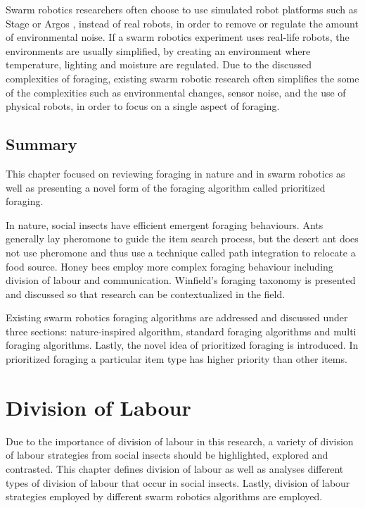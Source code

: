 Swarm robotics researchers often choose to use simulated robot platforms such as Stage \cite{vaughan2008massively} or Argos \cite{pinciroli2011argos}, instead of real robots, in order to remove or regulate the amount of environmental noise. If a swarm robotics experiment uses real-life robots, the environments are usually simplified, by creating an environment where temperature, lighting and moisture are regulated\cite{labella2006division,nouyan2006group}. Due to the discussed complexities of foraging, existing swarm robotic research often simplifies the some of the complexities such as environmental changes, sensor noise, and the use of physical robots, in order to focus on a single aspect of foraging. 

\section{Summary}
\label{foraging:summary}

This chapter focused on reviewing foraging in nature and in swarm robotics as well as presenting a novel form of the foraging algorithm called prioritized foraging. 

In nature, social insects have efficient emergent foraging behaviours. Ants generally lay pheromone to guide the item search process, but the desert ant does not use pheromone and thus use a technique called path integration to relocate a food source. Honey bees employ more complex foraging behaviour including division of labour and communication. Winfield's foraging taxonomy is presented and discussed so that research can be contextualized in the field. 

Existing swarm robotics foraging algorithms are addressed and discussed under three sections: nature-inspired algorithm, standard foraging algorithms and multi foraging algorithms. Lastly, the novel idea of prioritized foraging is introduced. In prioritized foraging a particular item type has higher priority than other items. 

\chapter{Division of Labour}
\label{chap:divisionoflabour}

Due to the importance of division of labour in this research, a variety of division of labour strategies from social insects should be highlighted, explored and contrasted. This chapter defines division of labour as well as analyses different types of division of labour that occur in social insects. Lastly, division of labour strategies employed by different swarm robotics algorithms are employed. 

